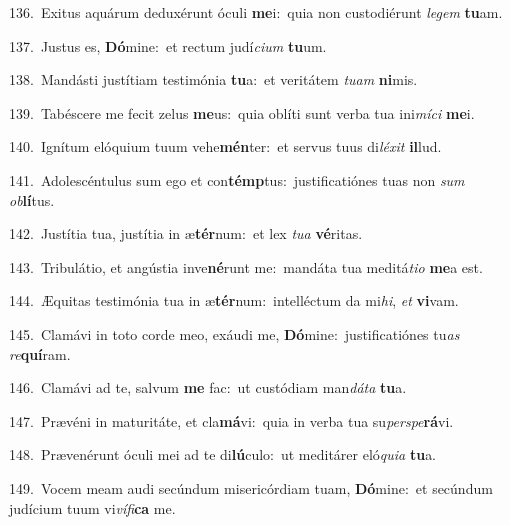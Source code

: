 {\numbfont\textcolor{\numbcolor}{136.}}~Exitus aquárum deduxérunt óculi \textbf{me}\-i:~\star quia non custodiérunt \textit{le}\-\textit{gem} \textbf{tu}\-am.\par
{\numbfont\textcolor{\numbcolor}{137.}}~Justus es, \textbf{Dó}\-mine:~\star et rectum judí\-\textit{ci}\-\textit{um} \textbf{tu}\-um.\par
{\numbfont\textcolor{\numbcolor}{138.}}~Mandásti justítiam testimónia \textbf{tu}\-a:~\star et veritátem \textit{tu}\-\textit{am} \textbf{ni}\-mis.\par
{\numbfont\textcolor{\numbcolor}{139.}}~Tabéscere me fecit zelus \textbf{me}\-us:~\star quia oblíti sunt verba tua ini\-\textit{mí}\-\textit{ci} \textbf{me}\-i.\par
{\numbfont\textcolor{\numbcolor}{140.}}~Ignítum elóquium tuum vehe\-\textbf{mén}\-ter:~\star et servus tuus di\-\textit{lé}\-\textit{xit} \textbf{il}\-lud.\par
{\numbfont\textcolor{\numbcolor}{141.}}~Adolescéntulus sum ego et con\-\textbf{témp}\-tus:~\star justificatiónes tuas non \textit{sum} \textit{ob}\-\textbf{lí}tus.\par
{\numbfont\textcolor{\numbcolor}{142.}}~Justítia tua, justítia in æ\-\textbf{tér}\-num:~\star et lex \textit{tu}\-\textit{a} \textbf{vé}\-ritas.\par
{\numbfont\textcolor{\numbcolor}{143.}}~Tribulátio, et angústia inve\-\textbf{né}\-runt me:~\star mandáta tua meditá\-\textit{ti}\-\textit{o} \textbf{me}\-a est.\par
{\numbfont\textcolor{\numbcolor}{144.}}~Æquitas testimónia tua in æ\-\textbf{tér}\-num:~\star intelléctum da mi\-\textit{hi}\-, \textit{et} \textbf{vi}\-vam.\par
{\numbfont\textcolor{\numbcolor}{145.}}~Clamávi in toto corde meo, exáudi me, \textbf{Dó}\-mine:~\star justificatiónes tu\textit{as} \textit{re}\-\textbf{quí}ram.\par
{\numbfont\textcolor{\numbcolor}{146.}}~Clamávi ad te, salvum \textbf{me} fac:~\star ut custódiam man\-\textit{dá}\-\textit{ta} \textbf{tu}\-a.\par
{\numbfont\textcolor{\numbcolor}{147.}}~Prævéni in maturitáte, et cla\-\textbf{má}\-vi:~\star quia in verba tua su\-\textit{per}\-\textit{spe}\textbf{rá}vi.\par
{\numbfont\textcolor{\numbcolor}{148.}}~Prævenérunt óculi mei ad te di\-\textbf{lú}\-culo:~\star ut meditárer eló\-\textit{qui}\-\textit{a} \textbf{tu}\-a.\par
{\numbfont\textcolor{\numbcolor}{149.}}~Vocem meam audi secúndum misericórdiam tuam, \textbf{Dó}\-mine:~\star et secúndum judícium tuum vi\-\textit{ví}\-\textit{fi}\textbf{ca} me.\par
